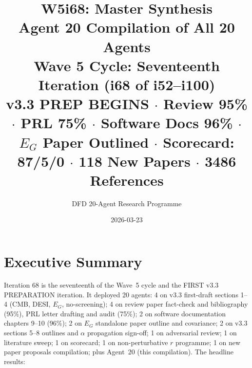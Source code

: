 \documentclass[11pt,a4paper]{article}
\title{\Huge W5i68: Master Synthesis\\[12pt]
\Large Agent 20 Compilation of All 20 Agents\\[6pt]
\large Wave 5 Cycle: Seventeenth Iteration (i68 of i52--i100)\\[6pt]
\normalsize \textbf{v3.3 PREP BEGINS} $\cdot$ Review 95\% $\cdot$ PRL 75\% $\cdot$ Software Docs 96\% $\cdot$ $E_G$ Paper Outlined $\cdot$ Scorecard: 87/5/0 $\cdot$ 118 New Papers $\cdot$ 3486 References}
\author{DFD 20-Agent Research Programme}
\date{2026-03-23}
\begin{document}
\maketitle


\section{Executive Summary}

Iteration 68 is the seventeenth of the Wave~5 cycle and the FIRST v3.3 PREPARATION iteration. It deployed 20 agents: 4 on v3.3 first-draft sections 1--4 (CMB, DESI, $E_G$, no-screening); 4 on review paper fact-check and bibliography (95\%), PRL letter drafting and audit (75\%); 2 on software documentation chapters 9--10 (96\%); 2 on $E_G$ standalone paper outline and covariance; 2 on v3.3 sections 5--8 outlines and $\alpha$ propagation sign-off; 1 on adversarial review; 1 on literature sweep; 1 on scorecard; 1 on non-perturbative $r$ programme; 1 on new paper proposals compilation; plus Agent~20 (this compilation). The headline results:
\end{document}
